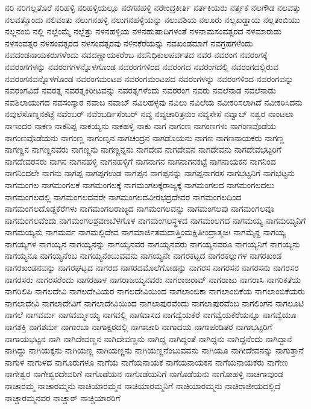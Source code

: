 {ನರಿ
ನರಿಗಲ್ಲತೊರೆ
ನರಿಹಳ್ಳಿ
ನರಿಹಳ್ಳಿಯಲ್ಲೂ
ನರೆಗನಹಳ್ಳಿ
ನರೇಂದ್ರಕೀರ್ತಿ
ನರ್ತಕಿಯರು
ನರ್ತ್ತಕೆ
ನಲಗೌಡ
ನಲವತ್ತು
ನಲವತ್ತೊಂದು
ನಲಿವಂತು
ನಲುಗನಹಳ್ಳಿ
ನಲುಗನಹಳ್ಳಿಯನ್ನು
ನಲುವಶಿಯ
ನಲೂರು
ನಲ್ಲಖಡ್ಡಾಯ
ನಲ್ಲತಂಬಿಯು
ನಲ್ಲನಂಬಿ
ನಲ್ಲಿ
ನಲ್ಲೆಂಮ್ಮೆ
ನಲ್ಲೆತ್ತು
ನಳನಹಳ್ಳಿಯ
ನಳನಹುಷಾದಿಗಳಂತೆ
ನಳನಾಮಸಂವತ್ಸರದ
ನಳಮಾರುಡು
ನಳಸಂವತ್ಸರ
ನಳಸಂವತ್ಸರದ
ನಳಸಂವತ್ಸರವು
ನಳಿನಕೆರೆಯನ್ನು
ನವಖಂಡಮಾಗೆ
ನವಗ್ರಹಗಳೆಂದು
ನವದಂಡನಾಯಕರುಗಳೆಂದು
ನವದಣ್ಣಾಯಕರೆಂಬ
ನವನಿಧಿಕುಲಪರ್ವತದ
ನವರ
ನವರಂಗ
ನವರಂಗಕ್ಕೆ
ನವರಂಗಗಳನ್ನು
ನವರಂಗಗಳನ್ನೊಳಗೊಂಡ
ನವರಂಗಗಳಿಂದ
ನವರಂಗದ
ನವರಂಗದಲ್ಲಿ
ನವರಂಗದಲ್ಲಿರುವ
ನವರಂಗನವನ್ನೊಳಗೊಂಡ
ನವರಂಗಮಂಟಪ
ನವರಂಗಮಂಟಪದ
ನವರಂಗಳನ್ನು
ನವರಂಗಳಿಂದ
ನವರಂಗವನ್ನು
ನವರಂಗವಿದೆ
ನವರತ್ನ
ನವರತ್ನಕಿರೀಟವನ್ನು
ನವರತ್ನಗಳೆಂದು
ನವರರಂಗ
ನವರು
ನವಲೆನಾಡ
ನವಲೆನಾಡು
ನವಶಿಲಾಯುಗದ
ನವಸಂಸ್ಕಾರ
ನವಾಬ
ನವಾಬ್
ನವಿಲಹಳ್ಳವು
ನವಿಲು
ನವಿಲೆಯ
ನವೀಕರಿಸಲಾಗಿದೆ
ನವೀಕರಿಸಿದನು
ನವುಲೆಸೊಣ್ನನಕಟ್ಟೆ
ನವೆಂಬರ್
ನವೆಂಬರ್ಡಿಸೆಂಬರ್
ನವ್ಯ
ನವ್ಯಚಾರಿತ್ರನುಂ
ನವ್ಯಸೇಸೆ
ನವ್ವಾಬ್
ನಶ್ವರ
ನಾಂಟಲಾ
ನಾಇಂದರ
ನಾಕಣ
ನಾಕನಿಪ್ಪ
ನಾಕಯ್ಯನು
ನಾಕಹಳ್ಳಿ
ನಾಕು
ನಾಗ
ನಾಗಂಣ
ನಾಗಂಣಗಳು
ನಾಗಂಣವೊಡೆಯ
ನಾಗಂಣವೊಡೆಯನು
ನಾಗಂಣ್ಣ
ನಾಗಂಣ್ನನ
ನಾಗಚಂದ್ರನ
ನಾಗಡೊಯನು
ನಾಗಣ
ನಾಗಣನಾಯಕರು
ನಾಗಣ್ಣ
ನಾಗಣ್ಣನ
ನಾಗಣ್ಣನವರು
ನಾಗಣ್ಣನು
ನಾಗಣ್ಣನ್ನನು
ನಾಗದೇವ
ನಾಗದೇವನ
ನಾಗದೇವನು
ನಾಗದೇವಭಟ್ಟರಿಗೆ
ನಾಗದೇವರಸರು
ನಾಗನ
ನಾಗನಹಳ್ಳಿ
ನಾಗನಹಳ್ಳಿಗೆ
ನಾಗನಾಗನ
ನಾಗನಾಗನಕಟ್ಟೆ
ನಾಗನಾಯಕನ
ನಾಗನಿಂದ
ನಾಗನಿಂದಲೇ
ನಾಗನು
ನಾಗಪ್ಪ
ನಾಗಪ್ಪಗಉಡ
ನಾಗಪ್ಪನ
ನಾಗಪ್ಪನನ್ನು
ನಾಗಪ್ಪನಾಗರಸ
ನಾಗಭಟ್ಟನಿಗೆ
ನಾಗಭಟ್ಟನು
ನಾಗಮಂಗಲ
ನಾಗಮಂಗಲಕೆ
ನಾಗಮಂಗಲಕ್ಕೆ
ನಾಗಮಂಗಲಕ್ಕೆರಾಜ್ಯಕ್ಕೆ
ನಾಗಮಂಗಲದ
ನಾಗಮಂಗಲದಲು
ನಾಗಮಂಗಲದಲ್ಲಿ
ನಾಗಮಂಗಲದವರೇ
ನಾಗಮಂಗಲದವೀರಭದ್ರದೇವರ
ನಾಗಮಂಗಲದಿಂದ
ನಾಗಮಂಗಲದೊಡ್ಡಕೆರೆಗಳು
ನಾಗಮಂಗಲರಾಜ್ಯದ
ನಾಗಮಂಗಲವನ್ನು
ನಾಗಮಂಗಲವು
ನಾಗಮಂಗಲವೂ
ನಾಗಮಂಗಲವೆಂದು
ನಾಗಮಂಗಲಶ್ರವಣಬೆಳಗೊಳ
ನಾಗಮಂಗಲಸ್ಥಳದ
ನಾಗಮಂಲಗದ
ನಾಗಮಯ್ಯ
ನಾಗಮಯ್ಯನಿಗೆ
ನಾಗಮಯ್ಯನು
ನಾಗಮರ್ವ
ನಾಗಮಲ್ಲಿದೇವ
ನಾಗಮಾರ್ಜಿತಮದಾತ್ತಿಂಮಕ್ಷಿತೀಂದ್ರಾತ್ಮಜಃ
ನಾಗಮೈನ್ದ
ನಾಗಯ್ಯ
ನಾಗಯ್ಯಗಳ
ನಾಗಯ್ಯನ
ನಾಗಯ್ಯನನ್ನು
ನಾಗಯ್ಯನವರ
ನಾಗಯ್ಯನವರು
ನಾಗಯ್ಯನವರೂ
ನಾಗಯ್ಯನಿಗೆ
ನಾಗಯ್ಯನು
ನಾಗಯ್ಯನೂ
ನಾಗಯ್ಯನೆಂಬ
ನಾಗಯ್ಯನೆಂಬುವವನು
ನಾಗಯ್ಯನೇ
ನಾಗರಕಟ್ಟದ
ನಾಗರಕಲ್ಲುಗಳ
ನಾಗರಖಂಡ
ನಾಗರಖಂಡನವನ್ನು
ನಾಗರಘಟ್ಟದ
ನಾಗರದ
ನಾಗರದಮೊಲೆಗೋಡನ್ನು
ನಾಗರಸ
ನಾಗರಸನ
ನಾಗರಸನು
ನಾಗರಸರ
ನಾಗರಸರು
ನಾಗರಸರೆಂದು
ನಾಗರಹಾಳ
ನಾಗರಾಜಯ್ಯನವರು
ನಾಗರಾಜರಾವ್
ನಾಗರಾಜು
ನಾಗರಾಸಿ
ನಾಗರಿಕತೆಯ
ನಾಗರಿಲಿಪಿ
ನಾಗಲದೇವಿ
ನಾಗಲದೇವಿಯರ
ನಾಗಲದೇವಿಯಿಂದ
ನಾಗಲಾಂಬಿಕಾ
ನಾಗಲಾಂಬಿಕೆಯ
ನಾಗಲಾಂಬಿಕೆಯರು
ನಾಗಲಾದೇವಿ
ನಾಗಲಾದೇವಿಗೆ
ನಾಗಲಾದೇವಿಯಿಂದ
ನಾಗಲಾಪುರವೆಂದು
ನಾಗಲಾಪುರವೆಂಬ
ನಾಗಲಿಂಗನ
ನಾಗಲೂಟಿ
ನಾಗಲೆ
ನಾಗವರ್ಮ
ನಾಗವರ್ಮ್ಮಯ್ಯ
ನಾಗವಲ್ಲಿ
ನಾಗವಾಸದ
ನಾಗವ್ವೆಯಕೆರೆ
ನಾಗವ್ವೆಯಕೆರೆಯನ್ನೂ
ನಾಗವ್ವೆಯೂ
ನಾಗಶಕ್ತಿ
ನಾಗಶರ್ಮ
ನಾಗಾಂಬಾ
ನಾಗಾಕ್ಷರದಲ್ಲಿ
ನಾಗಾಚಾರಿ
ನಾಗಾದಯ
ನಾಗಾಪಂಡಿತರ
ನಾಗಾಭಟ್ಟರಿಗೆ
ನಾಗಾಯಭಟ್ಟನ
ನಾಗಿ
ನಾಗಿದೇವಣ್ಣನ
ನಾಗಿದೇವಣ್ಣನು
ನಾಗಿದ್ದ
ನಾಗಿದ್ದಂತೆ
ನಾಗಿದ್ದನು
ನಾಗಿದ್ದನೆಂದು
ನಾಗಿದ್ದಾನೆ
ನಾಗಿದ್ದು
ನಾಗಿಯಕ್ಕನು
ನಾಗಿಯಣ್ಣ
ನಾಗಿಯಣ್ಣನು
ನಾಗಿಯಣ್ಣನೆಂಬುವವನು
ನಾಗಿಯೂ
ನಾಗೀದೇವನನ್ನು
ನಾಗುತ್ತಾನೆ
ನಾಗುಳ
ನಾಗುಳದ
ನಾಗೂರುಗಳೂ
ನಾಗೆಯ
ನಾಗೆಯನಾಯಕ
ನಾಗೆಯನಾಯಕನ
ನಾಗೆಯನಾಯಕರು
ನಾಗೇಣ
ನಾಗೇಶ್ವರ
ನಾಗೇಶ್ವರದೇವರಿಗೆ
ನಾಗೊಡೆಯನ
ನಾಗೊಡೆಯನಿಗೆ
ನಾಗೊಡೆಯನು
ನಾಗೋಹಳ್ಳಿ
ನಾಚಗಾವುಂಡ
ನಾಚಾರಮ್ಮ
ನಾಚಾರಮ್ಮನು
ನಾಚಿಯಾರಮ್ಮನ
ನಾಚಿಯಾರಮ್ಮನಿಗೆ
ನಾಚಿಯಾರಮ್ಮನು
ನಾಚಿರಾಜೀಯದಲ್ಲಿದೆ
ನಾಚ್ಚಾರಮ್ಮನವರ
ನಾಚ್ಚಾರ್
ನಾಚ್ಚಿಯಾರರಿಗೆ
}
